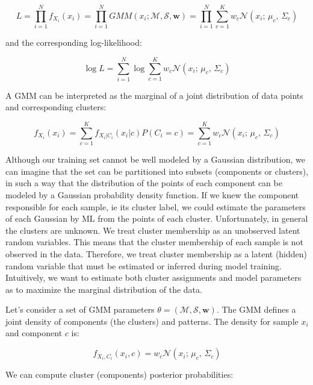\begin{equation*}
L = \prod_{i=1}^N f_{X_i}(x_i) = \prod_{i=1}^N GMM(x_i; \mathcal{M}, \mathcal{S}, \mathbf{w}) = \prod_{i=1}^N \sum_{c=1}^K w_c \mathcal{N}(x_i;\, \mu_c,\, \Sigma_c)
\end{equation*}

and the corresponding log-likelihood:


\begin{equation*}
\log L = \sum_{i=1}^N \log \sum_{c=1}^K w_c \mathcal{N}(x_i;\, \mu_c,\, \Sigma_c)
\end{equation*}

A GMM can be interpreted as the marginal of a joint distribution of data points and corresponding clusters:


\begin{equation*}
f_{X_i}(x_i) = \sum_{c=1}^K f_{X_i|C_i}(x_i|c) P(C_i = c) = \sum_{c=1}^K w_c \mathcal{N}(x_i;\, \mu_c,\, \Sigma_c)
\end{equation*}

Although our training set cannot be well modeled by a Gaussian distribution, we can imagine that the set can be partitioned into subsets (components or clusters), in such a way that the distribution of the points of each component can be modeled by a Gaussian probability density function. If we knew the component responsible for each sample, ie its cluster label, we could estimate the parameters of each Gaussian by ML from the points of each cluster. Unfortunately, in general the clusters are unknown. We treat cluster membership as an unobserved latent random variables. This means that the cluster membership of each sample is not observed in the data. Therefore, we treat cluster membership as a latent (hidden) random variable that must be estimated or inferred during model training. Intuitively, we want to estimate both cluster assignments and model parameters as to maximize the marginal distribution of the data.

Let's consider a set of GMM parameters $\theta = (\mathcal{M}, \mathcal{S}, \mathbf{w})$. The GMM defines a joint density of components (the clusters) and patterns. The density for sample $x_i$ and component $c$ is:


\begin{equation*}
f_{X_i, C_i}(x_i, c) = w_c \mathcal{N}(x_i;\, \mu_c,\, \Sigma_c)
\end{equation*}

We can compute cluster (components) posterior probabilities:


